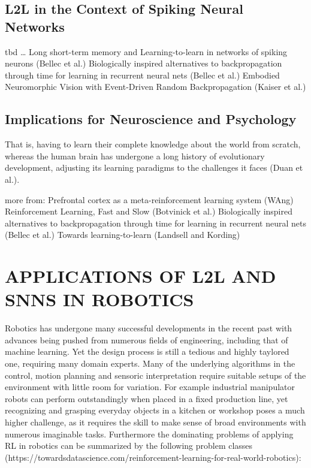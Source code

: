 \documentclass[letterpaper, 10 pt, conference]{ieeeconf}  %
\begin{document}
\subsection{L2L in the Context of Spiking Neural Networks}

tbd \dots
Long short-term memory and Learning-to-learn in networks of spiking neurons (Bellec et al.)
Biologically inspired alternatives to backpropagation through time for learning in recurrent neural nets (Bellec et al.)
Embodied Neuromorphic Vision with Event-Driven Random Backpropagation (Kaiser et al.)

\subsection{Implications for Neuroscience and Psychology}
That is, having to learn their complete knowledge about the world from scratch, whereas the human brain has undergone a long history of evolutionary
development, adjusting its learning paradigms to the challenges it faces (Duan et al.). \newline

more from: \newline
Prefrontal cortex as a meta-reinforcement learning system (WAng)
Reinforcement Learning, Fast and Slow (Botvinick et al.) \newline
Biologically inspired alternatives to backpropagation through time for learning in recurrent neural nets (Bellec et al.) \newline
Towards learning-to-learn (Landsell and Kording) \newline

\section{APPLICATIONS OF L2L AND SNNS IN ROBOTICS}

Robotics has undergone many successful developments in the recent past with advances being pushed from 
numerous fields of engineering, including that of machine learning. Yet the design process is still a tedious and 
highly taylored one, requiring many domain experts. Many of the underlying algorithms in 
the control, motion planning and sensoric interpretation require suitable setups of the environment with little room
for variation. For example industrial manipulator robots can perform outstandingly when placed in a fixed production line, yet 
recognizing and grasping everyday objects in a kitchen or workshop poses a much higher challenge, as it requires the skill to 
make sense of broad environments with numerous imaginable tasks. Furthermore the dominating problems of applying RL in 
robotics can be summarized by the following problem classes (https://towardsdatascience.com/reinforcement-learning-for-real-world-robotics):
\end{document}
